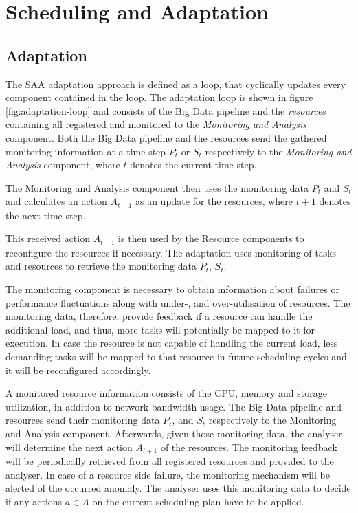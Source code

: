     \section{Scheduling and Adaptation}
    \label{sec:scheduling-and-adaptation-background}

        \subsection{Adaptation}
        The SAA adaptation approach is defined as a loop, that cyclically updates every component contained in the loop.
        The adaptation loop is shown in figure \ref{fig:adaptation-loop} and consists of the Big Data pipeline and the \emph{resources} containing all registered and monitored to the \emph{Monitoring and Analysis} component. 
        Both the Big Data pipeline and the resources send the gathered monitoring information at a time step $P_t$ or $S_t$ respectively to the \emph{Monitoring and Analysis} component, where $t$ denotes the current time step.

        The Monitoring and Analysis component then uses the monitoring data $P_t$ and $S_t$ and calculates an action $A_{t+1}$ as an update for the resources, where $t+1$ denotes the next time step.
  
        This received action $A_{t+1}$ is then used by the Resource components to reconfigure the resources if necessary.
        The adaptation uses monitoring of tasks and resources to retrieve the monitoring data $P_t$, $S_t$.
        
        The monitoring component is necessary to obtain information about failures or performance fluctuations along with under-, and over-utilisation of resources.
        The monitoring data, therefore, provide feedback if a resource can handle the additional load, and thus, more tasks will potentially be mapped to it for execution. 
        In case the resource is not capable of handling the current load, less demanding tasks will be mapped to that resource in future scheduling cycles and it will be reconfigured accordingly.

        A monitored resource information consists of the CPU, memory and storage utilization, in addition to network bandwidth usage.
        The Big Data pipeline and resources send their monitoring data $P_t$, and $S_t$ respectively to the Monitoring and Analysis component.
        Afterwards, given those monitoring data, the analyser will determine the next action $A_{t+1}$ of the resources.
        The monitoring feedback will be periodically retrieved from all registered resources and provided to the analyser.
        In case of a resource side failure, the monitoring mechanism will be alerted of the occurred anomaly.  
        The analyser uses this monitoring data to decide if any actions $a \in A$ on the current scheduling plan have to be applied.
  
